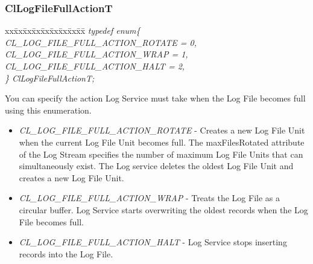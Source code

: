 \begin{flushleft}
\subsubsection{ClLogFileFullActionT}
\begin{tabbing}
xx\=xx\=xx\=xx\=xx\=xx\=xx\=xx\=xx\=\kill
\textit{typedef enum\{}\\
\>\>\>\>\textit{CL\_LOG\_FILE\_FULL\_ACTION\_ROTATE = 0,}\\
\>\>\>\>\textit{CL\_LOG\_FILE\_FULL\_ACTION\_WRAP = 1,}\\
\>\>\>\>\textit{CL\_LOG\_FILE\_FULL\_ACTION\_HALT = 2,}\\
\textit{\} ClLogFileFullActionT;}\end{tabbing}
You can specify the action Log Service must take when the Log File becomes full using this enumeration. 
\begin{itemize}
\item \textit{CL\_\-LOG\_\-FILE\_\-FULL\_\-ACTION\_\-ROTATE} - Creates a new Log File Unit when the current Log File Unit 
becomes full. The maxFilesRotated attribute of the Log Stream specifies the number of maximum Log File Units that can simultaneously exist.
The Log service deletes the oldest Log File Unit and creates a new Log File Unit.
\item
\textit{CL\_\-LOG\_\-FILE\_\-FULL\_\-ACTION\_\-WRAP} - Treats the Log File as a circular buffer. Log Service starts overwriting the oldest records
when the Log File becomes full.
\item	\textit{CL\_\-LOG\_\-FILE\_\-FULL\_\-ACTION\_\-HALT} - Log Service stops inserting records into the
Log File.
\end{itemize}





\end{flushleft}
